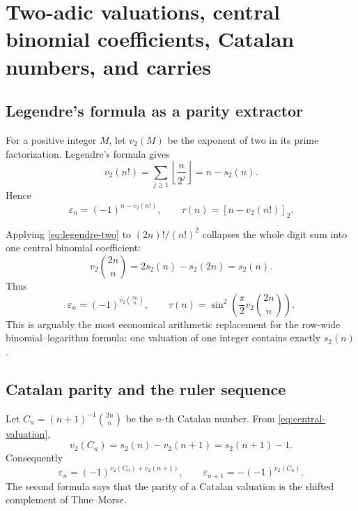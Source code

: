 \documentclass[11pt,oneside]{article}
\theoremstyle{definition}
\theoremstyle{remark}
\newcommand{\wt}{s_2}
\newcommand{\vtwo}{v_2}
\newcommand{\eps}{\varepsilon}
\newcommand{\res}[2]{\left[#1\right]_{#2}}
\begin{document}
\section{Two-adic valuations, central binomial coefficients, Catalan numbers, and carries}
\label{sec:valuations}

\subsection{Legendre's formula as a parity extractor}

For a positive integer \(M\), let \(\vtwo(M)\) be the exponent of two in its prime
factorization.  Legendre's formula gives
\begin{equation}
  \vtwo(n!)=\sum_{j\ge1}\left\lfloor\frac n{2^j}\right\rfloor
           =n-\wt(n).                                      \label{eq:legendre-two}
\end{equation}
Hence
\begin{equation}
  \boxed{
  \eps_n=(-1)^{n-\vtwo(n!)},
  \qquad
  \tau(n)=\res{n-\vtwo(n!)}2.}                             \label{eq:factorial-formulas}
\end{equation}

Applying \eqref{eq:legendre-two} to \((2n)!/(n!)^2\) collapses the whole digit sum into one
central binomial coefficient:
\begin{equation}
  \vtwo\binom{2n}{n}=2\wt(n)-\wt(2n)=\wt(n).                \label{eq:central-valuation}
\end{equation}
Thus
\begin{equation}
  \boxed{
  \eps_n=(-1)^{\vtwo\binom{2n}{n}},
  \qquad
  \tau(n)=\sin^2\!\left(\frac\pi2\vtwo\binom{2n}{n}\right).}                  \label{eq:central-binomial-formula}
\end{equation}
This is arguably the most economical arithmetic replacement for the row-wide
binomial--logarithm formula: one valuation of one integer contains exactly \(\wt(n)\).

\subsection{Catalan parity and the ruler sequence}

Let \(C_n=(n+1)^{-1}\binom{2n}{n}\) be the \(n\)-th Catalan number.  From
\eqref{eq:central-valuation},
\begin{equation}
  \vtwo(C_n)=\wt(n)-\vtwo(n+1)=\wt(n+1)-1.                  \label{eq:catalan-valuation}
\end{equation}
Consequently
\begin{equation}
  \boxed{
  \eps_n=(-1)^{\vtwo(C_n)+\vtwo(n+1)},
  \qquad
  \eps_{n+1}=-(-1)^{\vtwo(C_n)}.}                          \label{eq:catalan-signs}
\end{equation}
The second formula says that the parity of a Catalan valuation is the shifted complement of
Thue--Morse.
\end{document}
